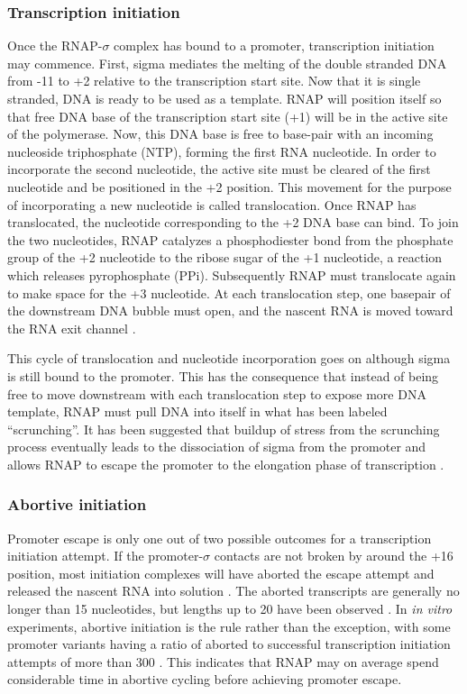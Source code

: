 \subsubsection{Transcription initiation}
Once the RNAP-$\sigma$ complex has bound to a promoter, transcription
initiation may commence. First, sigma mediates the melting of the double
stranded DNA from -11 to +2 relative to the transcription start site. Now that
it is single stranded, DNA is ready to be used as a template. RNAP will
position itself so that free DNA base of the transcription start site (+1) will
be in the active site of the polymerase. Now, this DNA base is free to
base-pair with an incoming nucleoside triphosphate (NTP), forming the first RNA
nucleotide. In order to incorporate the second nucleotide, the active site must
be cleared of the first nucleotide and be positioned in the +2 position. This
movement for the purpose of incorporating a new nucleotide is called
translocation. Once RNAP has translocated, the nucleotide corresponding to the
+2 DNA base can bind. To join the two nucleotides, RNAP catalyzes a
phosphodiester bond from the phosphate group of the +2 nucleotide to the ribose
sugar of the +1 nucleotide, a reaction which releases pyrophosphate (PPi).
Subsequently RNAP must translocate again to make space for the +3 nucleotide.
At each translocation step, one basepair of the downstream DNA bubble must
open, and the nascent RNA is moved toward the RNA exit channel
\cite{o_maoileidigh_unified_2011}.

This cycle of translocation and nucleotide incorporation goes on although sigma
is still bound to the promoter. This has the consequence that instead of being
free to move downstream with each translocation step to expose more DNA
template, RNAP must pull DNA into itself in what has been labeled
``scrunching''.  It has been suggested that buildup of stress from the
scrunching process eventually leads to the dissociation of sigma from the
promoter and allows RNAP to escape the promoter to the elongation phase of
transcription \cite{revyakin_abortive_2006}.

\subsubsection{Abortive initiation}
Promoter escape is only one out of two possible outcomes for a transcription
initiation attempt. If the promoter-$\sigma$ contacts are not broken by around
the +16 position, most initiation complexes will have aborted the escape
attempt and released the nascent RNA into solution
\cite{lilian_m_promoter_2002}. The aborted transcripts are generally no longer
than 15 nucleotides, but lengths up to 20 have been observed
\cite{chander_alternate_2007}. In \textit{in vitro} experiments, abortive
initiation is the rule rather than the exception, with some promoter variants
having a ratio of aborted to successful transcription initiation attempts of
more than 300 \cite{hsu_initial_2006}. This indicates that RNAP may on average
spend considerable time in abortive cycling before achieving promoter escape.


